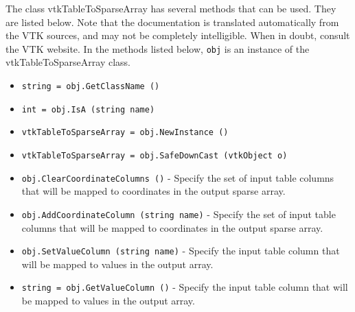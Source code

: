 The class vtkTableToSparseArray has several methods that can be used.
  They are listed below.
Note that the documentation is translated automatically from the VTK sources,
and may not be completely intelligible.  When in doubt, consult the VTK website.
In the methods listed below, \verb|obj| is an instance of the vtkTableToSparseArray class.
\begin{itemize}
\item  \verb|string = obj.GetClassName ()|

\item  \verb|int = obj.IsA (string name)|

\item  \verb|vtkTableToSparseArray = obj.NewInstance ()|

\item  \verb|vtkTableToSparseArray = obj.SafeDownCast (vtkObject o)|

\item  \verb|obj.ClearCoordinateColumns ()| -  Specify the set of input table columns that will be mapped to coordinates
 in the output sparse array.

\item  \verb|obj.AddCoordinateColumn (string name)| -  Specify the set of input table columns that will be mapped to coordinates
 in the output sparse array.

\item  \verb|obj.SetValueColumn (string name)| -  Specify the input table column that will be mapped to values in the output array.

\item  \verb|string = obj.GetValueColumn ()| -  Specify the input table column that will be mapped to values in the output array.

\end{itemize}
